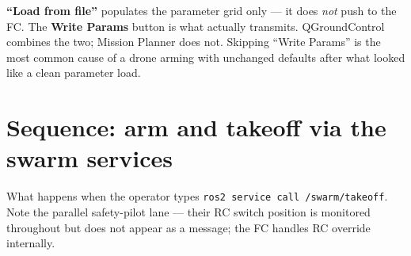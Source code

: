 \documentclass[11pt,a4paper]{article}
\begin{document}
\begin{tcolorbox}[colback=bggrey, colframe=warnred, arc=2pt, boxrule=0.5pt,
                  title={\small\bfseries Gotcha}, fonttitle=\color{warnred}]
\textbf{``Load from file''} populates the parameter grid only --- it does \emph{not} push
to the FC. The \textbf{Write Params} button is what actually transmits. QGroundControl
combines the two; Mission Planner does not. Skipping ``Write Params'' is the most common
cause of a drone arming with unchanged defaults after what looked like a clean
parameter load.
\end{tcolorbox}

\newpage

\section{Sequence: arm and takeoff via the swarm services}

What happens when the operator types
\texttt{ros2 service call /swarm/takeoff}. Note the parallel safety-pilot
lane --- their RC switch position is monitored throughout but does not
appear as a message; the FC handles RC override internally.
\end{document}

